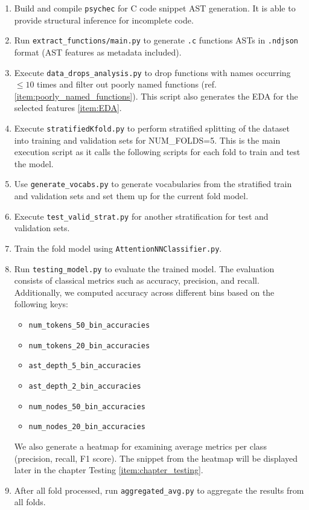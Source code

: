 \documentclass[10pt,english,a4paper]{report}
\begin{document}
 \begin{enumerate}
    \item Build and compile \texttt{psychec} for C code snippet AST generation. It is able to provide structural inference for incomplete code.

    \item Run \texttt{extract\_functions/main.py} to generate \texttt{.c} functions ASTs in \texttt{.ndjson} format (AST features as metadata included).

    \item Execute \texttt{data\_drops\_analysis.py} to drop functions with names occurring $\leq 10$ times and filter out poorly named functions (ref. \ref{item:poorly_named_functions}). 
    This script also generates the EDA for the selected features \ref{item:EDA}.

    \item Execute \texttt{stratifiedKfold.py} to perform stratified splitting of the dataset into training and validation sets for NUM\_FOLDS=5. This is the main execution
    script as it calls the following scripts for each fold to train and test the model.
    
    \item Use \texttt{generate\_vocabs.py} to generate vocabularies from the stratified train and validation sets and set them up for the current fold model.

    \item Execute \texttt{test\_valid\_strat.py} for another stratification for test and validation sets.

    \item Train the fold model using \texttt{AttentionNNClassifier.py}.

    \item Run \texttt{testing\_model.py} to evaluate the trained model. The evaluation consists of 
    classical metrics such as accuracy, precision, and recall. Additionally, we computed accuracy across 
    different bins based on the following keys:
    
    \begin{itemize}
        \item \texttt{num\_tokens\_50\_bin\_accuracies}
        \item \texttt{num\_tokens\_20\_bin\_accuracies}
        \item \texttt{ast\_depth\_5\_bin\_accuracies}
        \item \texttt{ast\_depth\_2\_bin\_accuracies}
        \item \texttt{num\_nodes\_50\_bin\_accuracies}
        \item \texttt{num\_nodes\_20\_bin\_accuracies}
    \end{itemize}

    We also generate a heatmap for examining average metrics per class (precision, recall, F1 score). The snippet from the heatmap will be displayed later in the chapter Testing \ref{item:chapter_testing}.


    \item After all fold processed, run \texttt{aggregated\_avg.py} to aggregate the results from all folds. 
\end{enumerate}
\end{document}
